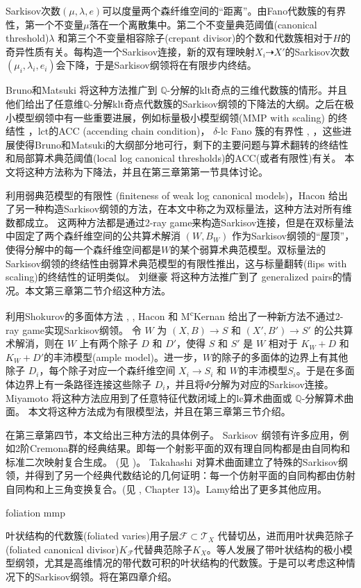 Sarkisov次数$(\mu,\lambda,e)$可以度量两个森纤维空间的“距离”。由Fano代数簇的有界性，第一个不变量$\mu$落在一个离散集中。第二个不变量典范阈值(canonical threshold)$\lambda$ 和第三个不变量相容除子(crepant divisor)的个数和代数簇相对于$
	H$的奇异性质有关。每构造一个Sarkisov连接，新的双有理映射$X_{i}\dashrightarrow X'$的Sarkisov次数$
	(\mu_{i},\lambda_{i},e_{i})$会下降，于是Sarkisov纲领将在有限步内终结。

Bruno和Matsuki \cite{brunoLogSarkisovProgram1995} 将这种方法推广到 $\mathbb{Q}$-分解的klt奇点的三维代数簇的情形。并且他们给出了任意维$\mathbb{Q}$-分解klt奇点代数簇的Sarkisov纲领的下降法的大纲。之后在极小模型纲领中有一些重要进展，例如标量极小模型纲领(MMP with scaling) 的终结性 \cite{BCHM10}，lct的ACC (accending chain condition)\cite{HMX14}， $\delta$-lc Fano 簇的有界性 \cite{Bir19}, \cite{birkarSingularitiesLinearSystems2020}，这些进展使得Bruno和Matsuki的大纲部分地可行，剩下的主要问题与算术翻转的终结性和局部算术典范阈值(local log canonical thresholds)的ACC(或者有限性)有关。
本文将这种方法称为下降法，并且在第三章第第一节具体讨论。


利用弱典范模型的有限性\cite{BCHM10} (finiteness of weak log canonical models)，Hacon \cite{haconMinimalModelProgram2012} 给出了另一种构造Sarkisov纲领的方法，在本文中称之为双标量法，这种方法对所有维数都成立。
这两种方法都是通过2-ray game来构造Sarkisov连接，但是在双标量法中固定了两个森纤维空间的公共算术解消 $(W,B_W)$ 作为Sarkisov纲领的``屋顶''，使得分解中的每一个森纤维空间都是$W$的某个弱算术典范模型。双标量法的Sarkisov纲领的终结性由弱算术典范模型的有限性推出，这与标量翻转(flips with scaling)的终结性的证明类似。
刘继豪 \cite{liuSarkisovProgramGeneralized2021} 将这种方法推广到了 generalized pairs的情况。本文第三章第二节介绍这种方法。


利用Shokurov的多面体方法 \cite{Sho96}, \cite{cs11}, Hacon 和 M\textsuperscript{c}Kernan \cite{haconSarkisovProgram2012}给出了一种新方法不通过2-ray game实现Sarkisov纲领。
令 $W$ 为 $(X,B)\to S$ 和 $(X',B')\to S'$ 的公共算术解消，则在 $W$ 上有两个除子 $D$ 和 $D'$，使得 $S$ 和 $S'$ 是 $W$ 相对于 $K_W+D$ 和 $K_W+D'$的丰沛模型(ample model)。进一步，$W$的除子的多面体的边界上有其他除子 $D_{i}$，每个除子对应一个森纤维空间 $X_i\to S_i$ 和 $W$的丰沛模型$S_i$。于是在多面体边界上有一条路径连接这些除子 $D_{i}$，并且将$\Phi$分解为对应的Sarkisov连接。
Miyamoto \cite{miyamoto2019TheSP} 将这种方法应用到了任意特征代数闭域上的lc算术曲面或 $\mathbb{Q}$-分解算术曲面。
本文将这种方法成为有限模型法，并且在第三章第三节介绍。

在第三章第四节，本文给出三种方法的具体例子。 Sarkisov 纲领有许多应用，例如2阶Cremona群的经典结果。即每一个射影平面的双有理自同构都是由自同构和标准二次映射复合生成。 (见 \cite[Chapter 2]{ksc04} )。 Takahashi \cite{tak95} 对算术曲面建立了特殊的Sarkisov纲领，并得到了另一个经典代数结论的几何证明：每一个仿射平面的自同构都由仿射自同构和上三角变换复合。(见 \cite[Chpter 13]{mat02}, Chapter 13)。Lamy\cite{lam22}给出了更多其他应用。

foliation mmp

叶状结构的代数簇(foliated varies)用子层$\mathcal{F} \subset \mathcal{T}_{X}$ 代替切丛，进而用叶状典范除子(foliated canonical divisor)$K_{\mathcal{F}}$代替典范除子$K_{X}$。等人发展了带叶状结构的极小模型纲领，尤其是高维情况的带代数可积的叶状结构的代数簇。于是可以考虑这种情况下的Sarkisov纲领。将在第四章介绍。

